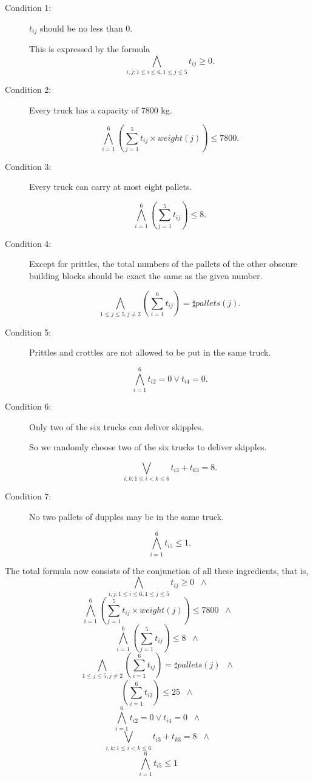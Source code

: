 \documentclass[11pt]{article}
\begin{document}
\begin{description}
  \item[Condition 1:] $t_{ij}$ should be no less than $0$.

  This is expressed by the formula
  \[ \bigwedge_{i,j:1 \leq i \leq 6, 1 \leq j \leq 5} t_{ij} \geq 0.\]
  \item[Condition 2:] Every truck has a capacity of 7800 kg.

  \[ \bigwedge_{i=1}^6  (\sum_{j=1}^5 t_{ij} \times weight(j)) \leq 7800 .\]
  \item[Condition 3:] Every truck can carry at most eight pallets.

  \[ \bigwedge_{i=1}^6 (\sum_{j=1}^5 t_{ij}) \leq 8 .\]
  \item[Condition 4:] Except for prittles, the total numbers of the pallets of the other obscure building blocks should be exact the same as the given number.

  \[ \bigwedge_{1\leq j \leq5, j\neq2} (\sum_{i=1}^6 t_{ij}) = \sharp pallets(j) .\]

  \item[Condition 5:] Prittles and crottles are not allowed to be put in the same truck.

  \[ \bigwedge_{i=1}^6 t_{i2}=0 \vee t_{i4}=0 .\]
  \item[Condition 6:] Only two of the six trucks can deliver skipples.

      So we randomly choose two of the six trucks to deliver skipples.

  \[ \bigvee_{i,k:1 \leq i < k \leq 6} t_{i3} + t_{k3} = 8 .\]
  \item[Condition 7:] No two pallets of dupples may be in the same truck.

  \[ \bigwedge_{i=1}^6 t_{i5} \leq 1 .\]
\end{description}

The total formula now consists of the conjunction of all these
ingredients, that is,
\[ \bigwedge_{i,j:1 \leq i \leq 6, 1 \leq j \leq 5} t_{ij} \geq 0 \;\; \wedge \]
\[ \bigwedge_{i=1}^6  (\sum_{j=1}^5 t_{ij} \times weight(j)) \leq 7800 \;\; \wedge \]
\[ \bigwedge_{i=1}^6 (\sum_{j=1}^5 t_{ij}) \leq 8 \;\; \wedge \]
\[ \bigwedge_{1\leq j \leq5, j\neq2} (\sum_{i=1}^6 t_{ij}) = \sharp pallets(j) \;\; \wedge \]
\[ (\sum_{i=1}^6 t_{i2}) \leq 25 \;\; \wedge \]
\[ \bigwedge_{i=1}^6 t_{i2}=0 \vee t_{i4}=0 \;\; \wedge \]
\[ \bigvee_{i,k:1 \leq i < k \leq 6} t_{i3} + t_{k3} = 8 \;\; \wedge \]
\[ \bigwedge_{i=1}^6 t_{i5} \leq 1 \]
\end{document}
